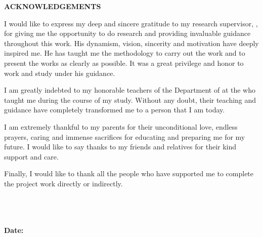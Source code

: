 \thispagestyle{plain}

\begin{center}
 \Large {\bf \uppercase{Acknowledgements}}
\end{center}

\vspace{3\baselineskip}

\noindent

I would like to express my deep and sincere gratitude to my research supervisor, \emph{\Supervisor}, for giving me the opportunity to do research and providing invaluable guidance throughout this work. His dynamism, vision, sincerity and motivation have deeply inspired me. He has taught me the methodology to carry out the work and to present the works as clearly as possible. It was a great privilege and honor to work and study under his guidance. 

I am greatly indebted to my honorable teachers of the Department of \College at the \University who taught  me during the course of my study. Without any doubt, their teaching and guidance have completely transformed me to a person that I am today.

I am extremely thankful to my parents for their unconditional love, endless prayers, caring and immense sacrifices for educating and preparing me for my future. I would like to say thanks to my friends and relatives for their kind support and care.

Finally, I would like to thank all the people who have supported me to complete the project work directly or indirectly.


\noindent
\vspace{\baselineskip} \\
\textit{\firstAuthor} \\
{\bf \University} \\
{\bf Date:} \reportSubmissionDate